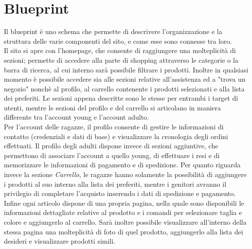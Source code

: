\documentclass[12pt,a4paper]{report}
\begin{document}
\chapter{Blueprint}
Il blueprint è uno schema che permette di descrivere l'organizzazione e la struttura delle varie componenti del sito, e come esse sono connesse tra loro.\\
Il sito si apre con l'homepage, che consente di raggiungere una molteplicità di sezioni; permette di accedere alla parte di shopping attraverso le categorie o la barra di ricerca, al cui interno sarà possibile filtrare i prodotti. Inoltre in qualsiasi momento è possibile accedere sia alle sezioni relative all'assistenza ed a "trova un negozio" nonchè al profilo, al carrello contenente i prodotti selezionati e alla lista dei preferiti. Le sezioni appena descritte sono le stesse per entrambi i target di utenti, mentre le sezioni del profilo e del carrello si articolano in maniera differente tra l'account young e l'account adulto.\\
Per l'account delle ragazze, il profilo consente di gestire le informazioni di contatto (credenziali e dati di base) e visualizzare la cronologia degli ordini effettuati. Il profilo degli adulti dispone invece di sezioni aggiuntive, che permettono di associare l'account a quello young, di effettuare i resi e di memorizzare le informazioni di pagamento e di spedizione. Per quanto riguarda invece la sezione \textit{Carrello}, le ragazze hanno solamente la possibilità di aggiungere i prodotti al suo interno alla lista dei preferiti, mentre i genitori avranno il privilegio di completare l'acquisto inserendo i dati di spedizione e pagamento.\\
Infine ogni articolo dispone di una propria pagina, nella quale sono disponibili le informazioni dettagliate relative al prodotto e i comandi per selezionare taglia e colore e aggiungerlo al carrello. Sarà inoltre possibile visualizzare all'interno della stessa pagina una molteplicità di foto di quel prodotto, aggiungerlo alla lista dei desideri e visualizzare prodotti simili.\\\\
\end{document}
